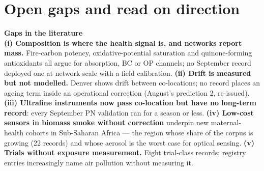 \documentclass[10pt]{article}
\begin{document}
\vspace{4mm}

\section*{\sffamily\bfseries\color{Deep}Open gaps and read on direction}
\vspace{-1.5mm}{\color{Coral}\rule{\linewidth}{1.1pt}}\vspace{2.5mm}

\begin{keybox}
{\sffamily\bfseries\footnotesize\color{Deep}Gaps in the literature}\\[1.2mm]
\footnotesize
\textbf{(i) Composition is where the health signal is, and networks report mass.} Fire-carbon
potency, oxidative-potential saturation and quinone-forming antioxidants all argue for absorption,
BC or OP channels; no September record deployed one at network scale with a field calibration.
\textbf{(ii) Drift is measured but not modelled.} Denver shows drift between co-locations; no record
places an ageing term inside an operational correction (August's prediction 2, re-issued).
\textbf{(iii) Ultrafine instruments now pass co-location but have no long-term record}: every
September PN validation ran for a season or less.
\textbf{(iv) Low-cost sensors in biomass smoke without correction} underpin new maternal-health
cohorts in Sub-Saharan Africa --- the region whose share of the corpus is growing (22 records) and
whose aerosol is the worst case for optical sensing.
\textbf{(v) Trials without exposure measurement.} Eight trial-class records; registry entries
increasingly name air pollution without measuring it.
\end{keybox}

\vspace{2.5mm}
\end{document}
